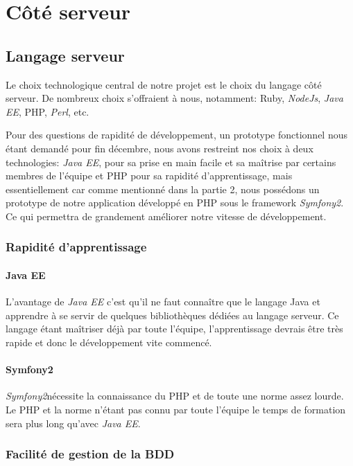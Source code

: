 \section{Côté serveur}

\subsection{Langage serveur}
Le choix technologique central de notre projet est le choix du langage côté serveur. De nombreux choix s'offraient à nous, notamment: Ruby, \textit{NodeJs}, \textit{Java EE}, PHP, \textit{Perl}, etc.

Pour des questions de rapidité de développement, un prototype fonctionnel nous étant demandé pour fin décembre, nous avons restreint nos choix à deux technologies: \textit{Java EE}, pour sa prise en main facile et sa maîtrise par certains membres de l'équipe et PHP pour sa rapidité d'apprentissage, mais essentiellement car comme mentionné dans la partie 2, nous possédons un prototype de notre application développé en PHP sous le framework \textit{Symfony2}. Ce qui permettra de grandement améliorer notre vitesse de développement.\\


\subsubsection{Rapidité d'apprentissage}
\paragraph{Java EE}
L'avantage de \textit{Java EE} c'est qu'il ne faut connaître que le langage Java et apprendre à se servir de quelques bibliothèques dédiées au langage serveur.
Ce langage étant maîtriser déjà par toute l'équipe, l'apprentissage devrais être très rapide et donc le développement vite commencé.

\paragraph{Symfony2}
\textit{Symfony2}nécessite la connaissance du PHP et de toute une norme assez lourde. 
Le PHP et la norme n'étant pas connu par toute l'équipe le temps de formation sera plus long qu'avec \textit{Java EE}.

\subsubsection{Facilité de gestion de la BDD}
